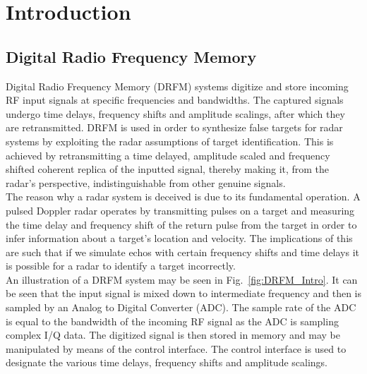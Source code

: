 \section{Introduction}
	\subsection{Digital Radio Frequency Memory}
	\noindent Digital Radio Frequency Memory (DRFM) systems digitize and store incoming RF input signals at specific frequencies and bandwidths. The captured signals undergo time delays, frequency shifts and amplitude scalings, after which they are retransmitted. DRFM is used in order to synthesize false targets for radar systems by exploiting the radar assumptions of target identification. This is achieved by retransmitting a time delayed, amplitude scaled and frequency shifted coherent replica of the inputted signal, thereby making it, from the radar's perspective, indistinguishable from other genuine signals\cite{SJROOME}.\\ \newline The reason why a radar system is deceived is due to its fundamental operation. A pulsed Doppler radar operates by transmitting pulses on a target and measuring the time delay and frequency shift of the return pulse from the target in order to infer information about a target's location and velocity. The implications of this are such that if we simulate echos with certain frequency shifts and time delays it is possible for a radar to identify a target incorrectly.\\ \newline An illustration of a DRFM system may be seen in Fig.~\ref{fig:DRFM_Intro}. It can be seen that the input signal is mixed down to intermediate frequency and then is sampled by an Analog to Digital Converter (ADC). The sample rate of the ADC is equal to the bandwidth of the incoming RF signal as the ADC is sampling complex I/Q data. The digitized signal is then stored in memory and may be manipulated by means of the control interface. The control interface is used to designate the various time delays, frequency shifts and amplitude scalings. 
